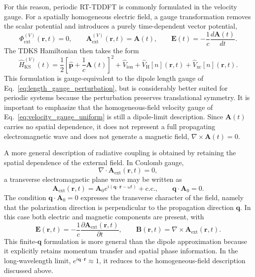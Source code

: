 For this reason, periodic RT-TDDFT is commonly formulated in the velocity gauge. For a spatially homogeneous electric field, a gauge transformation removes the scalar potential and introduces a purely time-dependent vector potential,
\begin{equation}
\Phi_{\mathrm{ext}}^{(V)}(\mathbf r,t)=0,
\qquad
\mathbf A_{\mathrm{ext}}^{(V)}(\mathbf r,t)=\mathbf A(t),
\qquad
\mathbf E(t)
=
-\frac{1}{c}\frac{d\mathbf A(t)}{dt}.
\label{eq:velocity_gauge_uniform}
\end{equation}
The TDKS Hamiltonian then takes the form
\begin{equation}
\hat H_{\mathrm{KS}}^{(V)}(t)
=
\frac{1}{2}
\left[
\hat{\mathbf p}
+
\frac{1}{c}\mathbf A(t)
\right]^2
+
\hat V_{\mathrm{ion}}
+
\hat V_{\mathrm{H}}[n](\mathbf r,t)
+
\hat V_{\mathrm{xc}}[n](\mathbf r,t).
\label{eq:tdks_velocity_gauge}
\end{equation}
This formulation is gauge-equivalent to the dipole length gauge of Eq.~\eqref{eq:length_gauge_perturbation}, but is considerably better suited for periodic systems because the perturbation preserves translational symmetry. It is important to emphasize that the homogeneous-field velocity gauge of Eq.~\eqref{eq:velocity_gauge_uniform} is still a dipole-limit description. Since \(\mathbf A(t)\) carries no spatial dependence, it does not represent a full propagating electromagnetic wave and does not generate a magnetic field, \(\nabla\times\mathbf A(t)=0\).

A more general description of radiative coupling is obtained by retaining the spatial dependence of the external field. In Coulomb gauge,
\begin{equation}
\nabla \cdot \mathbf A_{\mathrm{ext}}(\mathbf r,t)=0,
\label{eq:coulomb_gauge_condition2}
\end{equation}
a transverse electromagnetic plane wave may be written as
\begin{equation}
\mathbf A_{\mathrm{ext}}(\mathbf r,t)
=
\mathbf A_{0}
e^{i(\mathbf q\cdot\mathbf r-\omega t)}
+\mathrm{c.c.},
\qquad
\mathbf q\cdot\mathbf A_{0}=0.
\label{eq:transverse_plane_wave}
\end{equation}
The condition \(\mathbf q\cdot\mathbf A_{0}=0\) expresses the transverse character of the field, namely that the polarization direction is perpendicular to the propagation direction \(\mathbf q\). In this case both electric and magnetic components are present, with
\begin{equation}
\mathbf E(\mathbf r,t)
=
-\frac{1}{c}\frac{\partial \mathbf A_{\mathrm{ext}}(\mathbf r,t)}{\partial t},
\qquad
\mathbf B(\mathbf r,t)
=
\nabla\times \mathbf A_{\mathrm{ext}}(\mathbf r,t).
\label{eq:transverse_wave_fields}
\end{equation}
This finite-\(\mathbf q\) formulation is more general than the dipole approximation because it explicitly retains momentum transfer and spatial phase information. In the long-wavelength limit, \(e^{i\mathbf q\cdot\mathbf r}\approx 1\), it reduces to the homogeneous-field description discussed above.

